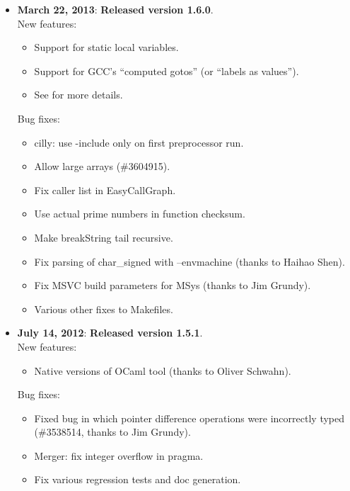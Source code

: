 \documentclass[letterpaper]{article}
\begin{document}
\begin{itemize}
\item{\bf March 22, 2013}: {\bf Released version 1.6.0}.\\
    New features:
    \begin{itemize}
      \item Support for static local variables.
      \item Support for GCC's ``computed gotos'' (or ``labels as values'').
      \item See  for more details.
    \end{itemize}
    Bug fixes:
    \begin{itemize}
      \item cilly: use -include only on first preprocessor run.
      \item Allow large arrays (\#3604915).
      \item Fix caller list in EasyCallGraph.
      \item Use actual prime numbers in function checksum.
      \item Make breakString tail recursive.
      \item Fix parsing of char\_signed with --envmachine (thanks to Haihao Shen).
      \item Fix MSVC build parameters for MSys (thanks to Jim Grundy).
      \item Various other fixes to Makefiles.
    \end{itemize}

\item{\bf July 14, 2012}: {\bf Released version 1.5.1}.\\
    New features:
    \begin{itemize}
        \item  Native versions of OCaml tool (thanks to Oliver Schwahn).
    \end{itemize}
    Bug fixes:
    \begin{itemize}
        \item Fixed bug in which pointer difference operations were incorrectly
            typed (\#3538514, thanks to Jim Grundy).
        \item Merger: fix integer overflow in pragma.
        \item Fix various regression tests and doc generation.
    \end{itemize}


\end{itemize}
\end{document}
